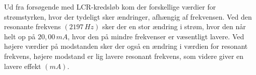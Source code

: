 Ud fra forsøgende med LCR-kredsløb kom der forskellige værdier for strømstyrken, hvor der tydeligt sker ændringer, afhængig af frekvensen. Ved den resonante frekvens $(2197 \, Hz)$ sker der en stor ændring i strøm, hvor den når helt op på $20,00 \, mA$, hvor den på mindre frekvenser er væsentligt lavere. Ved højere værdier på modstanden sker der også en ændring i værdien for resonant frekvens, højere modstand er lig lavere resonant frekvens, som videre giver en lavere effekt $(mA)$.

\newpage
